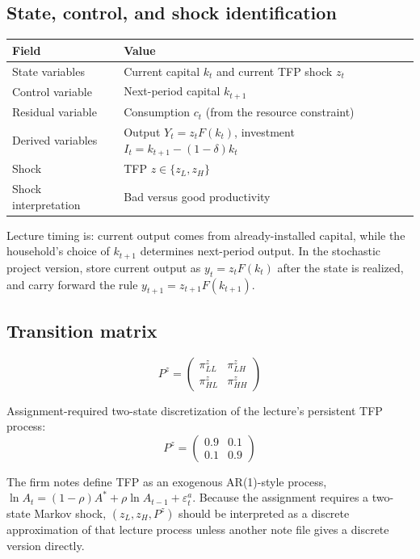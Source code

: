 \documentclass[11pt]{article}
\begin{document}
\subsection{State, control, and shock identification}

\begin{tabularx}{\linewidth}{@{}lX@{}}
\toprule
\textbf{Field} & \textbf{Value} \\
\midrule
State variables & Current capital $k_t$ and current TFP shock $z_t$ \\
Control variable & Next-period capital $k_{t+1}$ \\
Residual variable & Consumption $c_t$ (from the resource constraint) \\
Derived variables & Output $Y_t = z_tF(k_t)$, investment $I_t = k_{t+1} - (1-\delta)k_t$ \\
Shock & TFP $z \in \{z_L, z_H\}$ \\
Shock interpretation & Bad versus good productivity \\
\bottomrule
\end{tabularx}

\begin{notebox}
Lecture timing is: current output comes from already-installed capital, while the household's choice of $k_{t+1}$ determines next-period output. In the stochastic project version, store current output as $y_t = z_t F(k_t)$ after the state is realized, and carry forward the rule $y_{t+1} = z_{t+1}F(k_{t+1})$.
\end{notebox}

\subsection{Transition matrix}

\[
P^z = \begin{pmatrix} \pi_{LL}^z & \pi_{LH}^z \\ \pi_{HL}^z & \pi_{HH}^z \end{pmatrix}
\]

Assignment-required two-state discretization of the lecture's persistent TFP process:
\[
P^z = \begin{pmatrix} 0.9 & 0.1 \\ 0.1 & 0.9 \end{pmatrix}
\]

\begin{notebox}
The firm notes define TFP as an exogenous AR(1)-style process, $\ln A_t = (1-\rho)A^* + \rho \ln A_{t-1} + \varepsilon_t^a$. Because the assignment requires a two-state Markov shock, $(z_L,z_H,P^z)$ should be interpreted as a discrete approximation of that lecture process unless another note file gives a discrete version directly.
\end{notebox}
\end{document}
